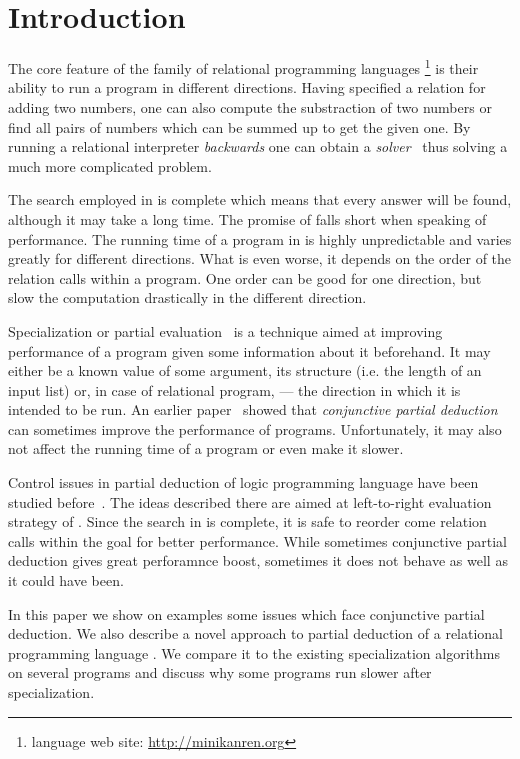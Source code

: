 \section{Introduction}

The core feature of the family of relational programming languages \mk{}\footnote{\mk{} language web site: \url{http://minikanren.org}} is their ability to run a program in different directions.
Having specified a relation for adding two numbers, one can also compute the substraction of two numbers or find all pairs of numbers which can be summed up to get the given one.
By running a relational interpreter \emph{backwards} one can obtain a \emph{solver}~\cite{lozov2019relational} thus solving a much more complicated problem.

The search employed in \mk{} is complete which means that every answer will be found, although it may take a long time.
The promise of \mk{} falls short when speaking of performance.
The running time of a program in \mk{} is highly unpredictable and varies greatly for different directions.
What is even worse, it depends on the order of the relation calls within a program.
One order can be good for one direction, but slow the computation drastically in the different direction.

Specialization or partial evaluation~\cite{jonesbook} is a technique aimed at improving performance of a program given some information about it beforehand.
It may either be a known value of some argument, its structure (i.e. the length of an input list) or, in case of relational program, --- the direction in which it is intended to be run.
An earlier paper~\cite{lozov2019relational} showed that \emph{conjunctive partial deduction}~\cite{de1999conjunctive} can sometimes improve the performance of \mk{} programs.
Unfortunately, it may also not affect the running time of a program or even make it slower.

Control issues in partial deduction of logic programming language \pro{} have been studied before~\cite{leuschel2002logic}.
The ideas described there are aimed at left-to-right evaluation strategy of \pro{}.
Since the search in \mk{} is complete, it is safe to reorder come relation calls within the goal for better performance.
While sometimes conjunctive partial deduction gives great perforamnce boost, sometimes it does not behave as well as it could have been.

In this paper we show on examples some issues which face conjunctive partial deduction.
We also describe a novel approach to partial deduction of a relational programming language \mk{}.
We compare it to the existing specialization algorithms on several programs and discuss why some \mk{} programs run slower after specialization.
